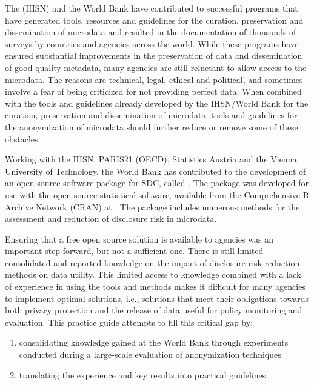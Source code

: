 \documentclass[letterpaper,10pt,english]{sphinxmanual}
\begin{document}
The  (IHSN)
and the World Bank have contributed to successful programs that have
generated tools, resources and guidelines for the curation, preservation
and dissemination of microdata and resulted in the documentation of
thousands of surveys by countries and agencies across the world. While
these programs have ensured substantial improvements in the preservation
of data and dissemination of good quality metadata, many agencies are
still reluctant to allow access to the microdata. The reasons are
technical, legal, ethical and political, and sometimes involve a fear of
being criticized for not providing perfect data. When combined with the
tools and guidelines already developed by the IHSN/World Bank for the
curation, preservation and dissemination of microdata, tools and
guidelines for the anonymization of microdata should further reduce or
remove some of these obstacles.

Working with the IHSN, PARIS21 (OECD), Statistics Austria and the Vienna
University of Technology, the World Bank has contributed to the
development of an open source software package for SDC, called
. The package was developed for use with the open source 
statistical software, available from the Comprehensive R Archive Network
(CRAN) at . The package includes numerous
methods for the assessment and reduction of disclosure risk in
microdata.

Ensuring that a free open source solution is available to agencies was
an important step forward, but not a sufficient one. There is still
limited consolidated and reported knowledge on the impact of disclosure
risk reduction methods on data utility. This limited access to knowledge
combined with a lack of experience in using the tools and methods makes
it difficult for many agencies to implement optimal solutions, i.e.,
solutions that meet their obligations towards both privacy protection
and the release of data useful for policy monitoring and evaluation.
This practice guide attempts to fill this critical gap by:
\begin{enumerate}
\item {} 
consolidating knowledge gained at the World Bank through
experiments conducted during a large-scale evaluation of
anonymization techniques

\item {} 
translating the experience and key results into practical
guidelines

\end{enumerate}
\end{document}
